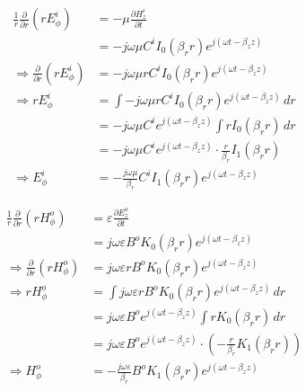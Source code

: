 \begin{equation}
	\begin{split}
		\frac{1}{r} \frac{\partial}{\partial r}(r E_\phi^i) &= -\mu \frac{\partial H_z^i}{\partial t} \\
		&= -j \omega \mu C^i I_0(\beta_r r) e^{j(\omega t - \beta_z z)} \\
		\Rightarrow \frac{\partial}{\partial r}(r E_\phi^i) &= -j \omega \mu r C^i I_0(\beta_r r) e^{j(\omega t - \beta_z z)} \\
		\Rightarrow r E_\phi^i &= \int -j \omega \mu r C^i I_0(\beta_r r) e^{j(\omega t - \beta_z z)} \, dr \\
		&= -j \omega \mu C^i e^{j(\omega t - \beta_z z)} \int r I_0(\beta_r r) \, dr \\
		&= -j \omega \mu C^i e^{j(\omega t - \beta_z z)} \cdot \frac{r}{\beta_r} I_1(\beta_r r) \\
		\Rightarrow E_\phi^i &= -\frac{j \omega \mu}{\beta_r} C^i I_1(\beta_r r) e^{j(\omega t - \beta_z z)}
	\end{split}
	\label{eq:Ephi_i}
\end{equation}

\begin{equation}
	\begin{split}
		\frac{1}{r} \frac{\partial}{\partial r}(r H_\phi^o) &= \varepsilon \frac{\partial E_z^o}{\partial t} \\
		&= j \omega \varepsilon B^o K_0(\beta_r r) e^{j(\omega t - \beta_z z)} \\
		\Rightarrow \frac{\partial}{\partial r}(r H_\phi^o) &= j \omega \varepsilon r B^o K_0(\beta_r r) e^{j(\omega t - \beta_z z)} \\
		\Rightarrow r H_\phi^o &= \int j \omega \varepsilon r B^o K_0(\beta_r r) e^{j(\omega t - \beta_z z)} \, dr \\
		&= j \omega \varepsilon B^o e^{j(\omega t - \beta_z z)} \int r K_0(\beta_r r) \, dr \\
		&= j \omega \varepsilon B^o e^{j(\omega t - \beta_z z)} \cdot \left( -\frac{r}{\beta_r} K_1(\beta_r r) \right) \\
		\Rightarrow H_\phi^o &= -\frac{j \omega \varepsilon}{\beta_r} B^o K_1(\beta_r r) e^{j(\omega t - \beta_z z)}
	\end{split}
	\label{eq:Hphi_o}
\end{equation}

